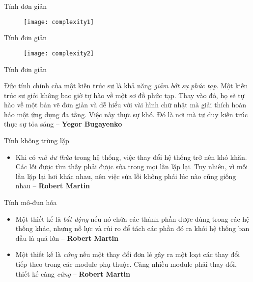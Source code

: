 \documentclass{beamer}
\newcommand{\ul}[1]{\emph{#1}}
\begin{document}
\begin{frame}{Tính đơn giản}
    \begin{figure}
        \centering
        \texttt{[image: complexity1]}
    \end{figure}
\end{frame}

\begin{frame}{Tính đơn giản}
    \begin{figure}
        \centering
        \texttt{[image: complexity2]}
    \end{figure}
\end{frame}

\begin{frame}{Tính đơn giản}
    \begin{block}{}
        Đức tính chính của một kiến trúc sư là khả năng
        \ul{giảm bớt sự phức tạp}. Một kiến trúc sư giỏi
        không bao giờ tự hào về một sơ đồ phức tạp. Thay vào
        đó, họ sẽ tự hào về một bản vẽ đơn giản và dễ hiểu
        với vài hình chữ nhật mà giải thích hoàn hảo một
        ứng dụng đa tầng. Việc này thực sự khó. Đó
        là nơi mà tư duy kiến trúc thực sự tỏa sáng
        -- \textbf{Yegor Bugayenko}
    \end{block}
\end{frame}

\begin{frame}{Tính không trùng lặp}
    \begin{itemize}
        \item Khi có \ul{\color{red}mã dư thừa} trong hệ thống, việc thay
        đổi hệ thống trở nên khó khăn. Các lỗi được tìm thấy
        phải được sửa trong mọi lần lặp lại. Tuy nhiên,
        vì mỗi lần lặp lại hơi khác nhau, nên việc sửa
        lỗi không phải lúc nào cũng giống nhau -- \textbf{Robert Martin}
    \end{itemize}
\end{frame}

\begin{frame}{Tính mô-đun hóa}
    \begin{itemize}
        \item Một thiết kế là \ul{\color{red}bất động} nếu nó
        chứa các thành phần
        được dùng trong các hệ thống khác, nhưng nỗ lực và
        rủi ro để tách các phần đó ra khỏi hệ thống ban đầu
        là quá lớn -- \textbf{Robert Martin}
        \item Một thiết kế là \ul{\color{red}cứng} nếu một
        thay đổi đơn lẻ gây ra một loạt các thay đổi tiếp
        theo trong các module phụ thuộc.
        Càng nhiều module phải thay đổi,
        thiết kế càng \ul{cứng} -- \textbf{Robert Martin}
    \end{itemize}
\end{frame}
\end{document}
